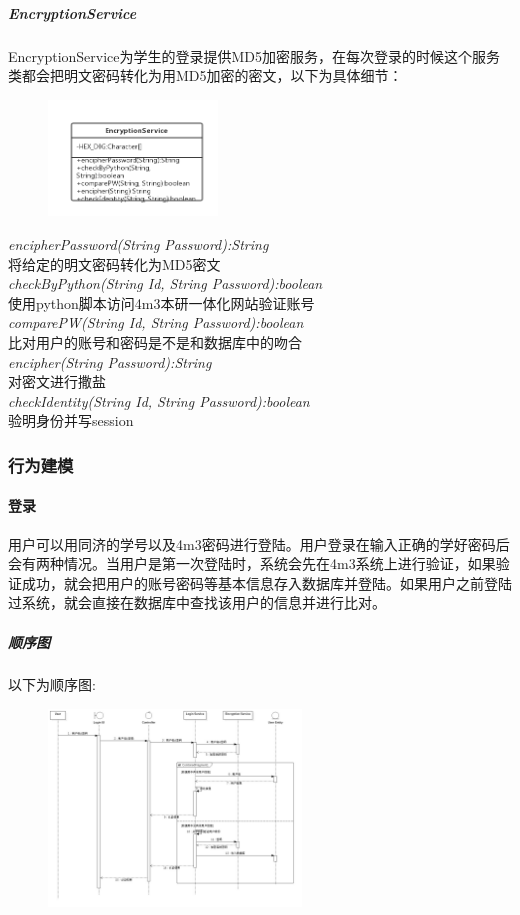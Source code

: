 \documentclass[UTF8]{ctexart}
\begin{document}
\subparagraph{EncryptionService}
EncryptionService为学生的登录提供MD5加密服务，在每次登录的时候这个服务类都会把明文密码转化为用MD5加密的密文，以下为具体细节：
\newline
\begin{figure}[H]
\centering
\includegraphics[width = 0.4\textwidth]{Encryption-rs.png}
\end{figure}
\begin{center}
\emph{encipherPassword(String Password):String}\\
将给定的明文密码转化为MD5密文\\
\emph{checkByPython(String Id, String Password):boolean}\\
使用python脚本访问4m3本研一体化网站验证账号\\
\emph{comparePW(String Id, String Password):boolean}\\
比对用户的账号和密码是不是和数据库中的吻合\\
\emph{encipher(String Password):String}\\
对密文进行撒盐\\
\emph{checkIdentity(String Id, String Password):boolean}\\
验明身份并写session
\end{center}

\subsubsection{行为建模}
\paragraph{登录}
用户可以用同济的学号以及4m3密码进行登陆。用户登录在输入正确的学好密码后会有两种情况。当用户是第一次登陆时，系统会先在4m3系统上进行验证，如果验证成功，就会把用户的账号密码等基本信息存入数据库并登陆。如果用户之前登陆过系统，就会直接在数据库中查找该用户的信息并进行比对。

\subparagraph*{顺序图}
以下为顺序图:\\
\begin{figure}[H]
\centering
\includegraphics[width = 0.6\textwidth]{loginSeq.jpg}
\end{figure}
\end{document}
